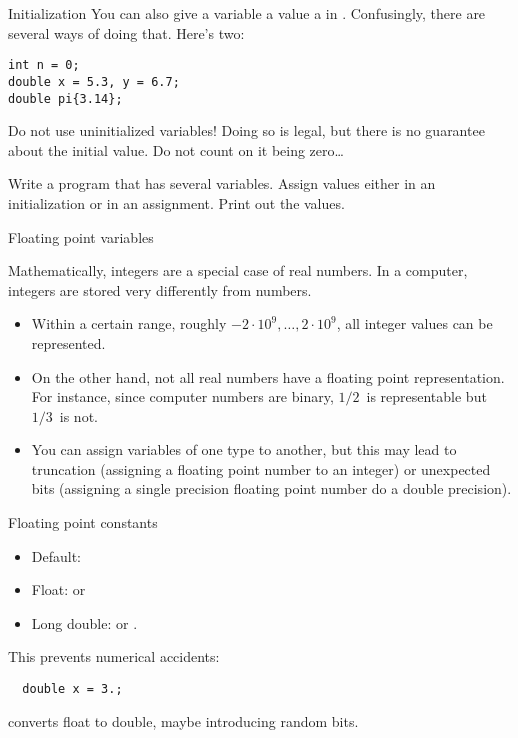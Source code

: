 \begin{block}{Initialization}
  \label{sl:init-var}
  You can also give a variable a value a in
  . Confusingly, there are
  several ways of doing that. Here's two:
\begin{verbatim}
int n = 0;
double x = 5.3, y = 6.7;
double pi{3.14};
\end{verbatim}
  Do not use uninitialized variables! Doing so is legal, but there is
  no guarantee about the initial value. Do not count on it being zero\ldots
\end{block}

\begin{exercise}
  \label{ex:print-variables}
  Write a program that has several variables. Assign values either in
  an initialization or in an assignment. Print out the values.
\end{exercise}

 {Floating point variables}

Mathematically, integers are a special case of real numbers.
In a computer, integers are stored very differently from
 numbers.
\begin{itemize}
\item Within a certain range, roughly
  $-2\cdot 10^9,\ldots,2\cdot 10^9$,
  all integer values can be represented.
\item On the other hand, not all real numbers have a floating point
  representation. For instance, since computer numbers are binary,
  $1/2$~is representable but $1/3$~is not.
\item You can assign variables of one type to another, but this may
  lead to truncation (assigning a floating point number to an integer)
  or unexpected bits (assigning a single precision floating point
  number do a double precision).
\end{itemize}

\begin{block}{Floating point constants}
  \label{sl:float-vars}
  \begin{itemize}
  \item Default: 
  \item Float:  or 
  \item Long double:  or .
  \end{itemize}
  This prevents numerical accidents: 
\begin{verbatim}
  double x = 3.;
\end{verbatim}
  converts float to double, maybe introducing random bits.
\end{block}

